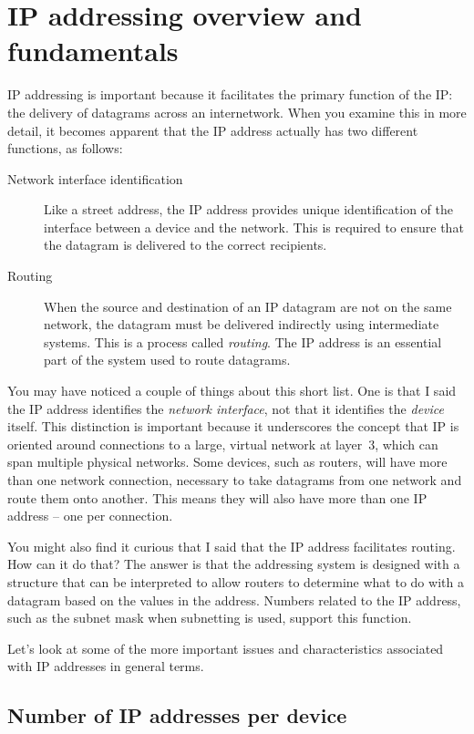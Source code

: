 \section{IP addressing overview and fundamentals}


IP addressing is important because it facilitates the primary function
of the IP: the delivery of datagrams across an internetwork. When you
examine this in more detail, it becomes apparent that the IP address
actually has two different functions, as follows:
\begin{description}
   \item[Network interface identification]
      Like a street address, the IP address provides unique identification of the interface between a device and the network.
      This is required to ensure that the datagram is delivered to the correct recipients.
   \item[Routing]
      When the source and destination of an IP datagram are not on the same network, the datagram must be delivered indirectly using intermediate systems.
      This is a process called \emph{routing}.
      The IP address is an essential part of the system used to route datagrams.
\end{description}

You may have noticed a couple of things about this short list.
One is
that I said the IP address identifies the {\emph{network interface}},
not that it identifies the {\emph{device}} itself. This distinction is
important because it underscores the concept that IP is oriented around
connections to a large, virtual network at layer~3, which can span
multiple physical networks. Some devices, such as routers, will have
more than one network connection, necessary to take datagrams from one
network and route them onto another. This means they will also have more
than one IP address -- one per connection.

You might also find it curious that I said that the IP address
facilitates routing. How can it do that? The answer is that the
addressing system is designed with a structure that can be interpreted
to allow routers to determine what to do with a datagram based on the
values in the address. Numbers related to the IP address, such as the
subnet mask when subnetting is used, support this function.

Let's look at some of the more important issues and characteristics
associated with IP addresses in general terms.

\subsection{Number of IP addresses per device}


